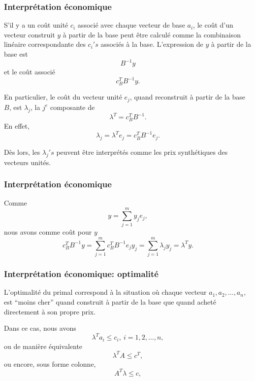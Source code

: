 \documentclass[usepdftitle=false]{beamer}
\begin{document}
\begin{frame}
	\frametitle{Interprétation économique}
	
	S'il y a un coût unité $c_i$ associé avec chaque vecteur de base $a_i$, le coût d'un vecteur construit $y$ à partir de la base peut être calculé comme la combinaison linéaire correspondante des $c_i's$ associés à la base. L'expression de $y$ à partir de la base est
	\[
	B^{-1}y
	\]
	et le coût associé
	\[
	c_B^T B^{-1}y.
	\]
	
	\mbox{}
	
	En particulier, le coût du vecteur unité $e_j$, quand reconstruit à partir de la base $B$, est $\lambda_j$, la $j^e$ composante de
	\[
	\lambda^T = c_B^T B^{-1}.
	\]
	En effet,
	\[
	\lambda_j = \lambda^T e_j = c_B^T B^{-1} e_j.
	\]
	
	Dès lors, les $\lambda_j's$ peuvent être interprétés comme les prix synthétiques des vecteurs unités.
	
\end{frame}

\begin{frame}
	\frametitle{Interprétation économique}
	
	Comme
	\[
	y = \sum_{j = 1}^m y_j e_j,
	\]
	nous avons comme coût pour $y$
	\[
	c_B^T B^{-1}y = \sum_{j = 1}^m c_B^T B^{-1} e_j y_j = \sum_{j = 1}^m \lambda_j y_j = \lambda^T y.
	\]
	
\end{frame}

\begin{frame}
	\frametitle{Interprétation économique: optimalité}
	
	L'optimalité du primal correspond à la situation où chaque vecteur $a_1, a_2,\ldots, a_n$, est ``moins cher'' quand construit à partir de la base que quand acheté directement à son propre prix.
	
	\mbox{}
	
	Dans ce cas, nous avons
	\[
	\lambda^T a_i \leq c_i,\ i = 1,2,\ldots,n,
	\]
	ou de manière équivalente
	\[
	\lambda^T A \leq c^T,
	\]
	ou encore, sous forme colonne,
	\[
	A^T\lambda \leq c,
	\]
	
\end{frame}




\end{document}
